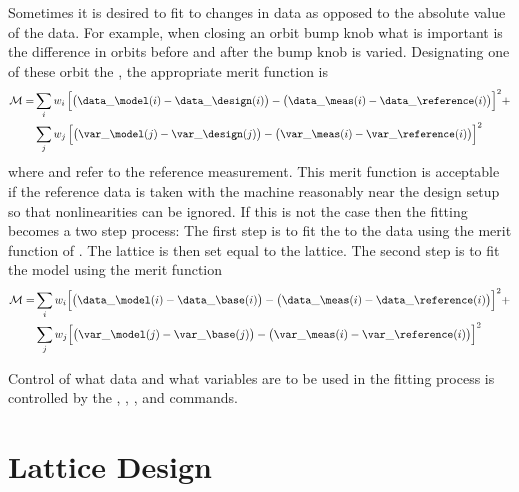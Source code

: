 Sometimes it is desired to fit to changes in data as opposed to the
absolute value of the data. For example, when closing an orbit bump
knob what is important is the difference in orbits before and after
the bump knob is varied. Designating one of these orbit the
, the appropriate merit function is
\begin{alignat}{1}
  {\cal M} = &\sum_{i} w_i \,
    \Bigl[ \bigl( \data\_\model(i) - \data\_\design(i) \bigr) - 
      \bigl( \data\_\meas(i) - \data\_\reference(i) \bigr) \Bigr]^2 + \CRNO
  &\sum_{j} w_j \,
    \Bigl[ \bigl( \var\_\model(j) - \var\_\design(j) \bigr) -
     \bigl( \var\_\meas(i) - \var\_\reference(i) \bigr) \Bigr]^2 
  \label{m2}
\end{alignat}
where  and  refer to the reference
measurement.  This merit function is acceptable if the reference data
is taken with the machine reasonably near the design setup so that
nonlinearities can be ignored. If this is not the case then the
fitting becomes a two step process: The first step is to fit the
 to the  data using the merit function of
. The  lattice is then set equal to the 
lattice. The second step is to fit the model using the merit function
\begin{alignat}{1}
  {\cal M} = &\sum_{i} w_i 
    \Bigl[ \bigl( \data\_\model(i) - \data\_\base(i) \bigr) - 
      \bigl( \data\_\meas(i) - \data\_\reference(i) \bigr) \Bigr]^2 + \CRNO
  &\sum_{j} w_j 
    \Bigl[ \bigl( \var\_\model(j) - \var\_\base(j) \bigr) -
     \bigl( \var\_\meas(i) - \var\_\reference(i) \bigr) \Bigr]^2 
  \label{m3}
\end{alignat}

Control of what data and what variables are to be used in the fitting
process is controlled by the , , , and
 commands.

\section{Lattice Design}
\label{s:lattice.design}

